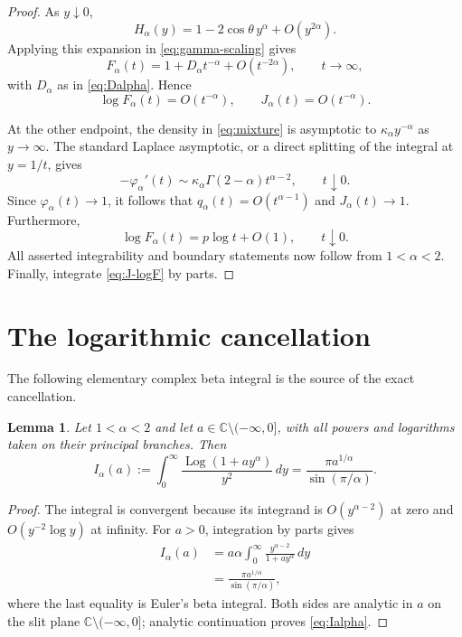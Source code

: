 \documentclass[11pt]{article}
\newtheorem{lemma}[theorem]{Lemma}
\theoremstyle{remark}
\newcommand{\Log}{\operatorname{Log}}
\begin{document}
\begin{proof}
As $y\downarrow0$,
\[
 H_\alpha(y)
 =1-2\cos\theta\,y^\alpha+O(y^{2\alpha}).
\]
Applying this expansion in \eqref{eq:gamma-scaling} gives
\[
 F_\alpha(t)
 =1+D_\alpha t^{-\alpha}+O(t^{-2\alpha}),
 \qquad t\to\infty,
\]
with $D_\alpha$ as in \eqref{eq:Dalpha}.  Hence
\[
 \log F_\alpha(t)=O(t^{-\alpha}),
 \qquad
 J_\alpha(t)=O(t^{-\alpha}).
\]

At the other endpoint, the density in \eqref{eq:mixture} is
asymptotic to $\kappa_\alpha y^{-\alpha}$ as $y\to\infty$.
The standard Laplace asymptotic, or a direct splitting of the
integral at $y=1/t$, gives
\[
 -\varphi_\alpha'(t)
 \sim\kappa_\alpha\Gamma(2-\alpha)t^{\alpha-2},
 \qquad t\downarrow0.
\]
Since $\varphi_\alpha(t)\to1$, it follows that
$q_\alpha(t)=O(t^{\alpha-1})$ and $J_\alpha(t)\to1$.
Furthermore,
\[
 \log F_\alpha(t)=p\log t+O(1),
 \qquad t\downarrow0.
\]
All asserted integrability and boundary statements now follow from
$1<\alpha<2$.  Finally, integrate
\eqref{eq:J-logF} by parts.
\end{proof}

\section{The logarithmic cancellation}

The following elementary complex beta integral is the source of the
exact cancellation.

\begin{lemma}\label{lem:complex-beta}
Let $1<\alpha<2$ and let $a\in\mathbb{C}\setminus(-\infty,0]$,
with all powers and logarithms taken on their principal branches.
Then
\begin{equation}\label{eq:Ialpha}
 I_\alpha(a)
 :=\int_0^\infty
   \frac{\Log(1+a y^\alpha)}{y^2}\,dy
 =\frac{\pi a^{1/\alpha}}{\sin(\pi/\alpha)}.
\end{equation}
\end{lemma}

\begin{proof}
The integral is convergent because its integrand is
$O(y^{\alpha-2})$ at zero and $O(y^{-2}\log y)$ at infinity.
For $a>0$, integration by parts gives
\begin{align*}
 I_\alpha(a)
 &=a\alpha\int_0^\infty
   \frac{y^{\alpha-2}}{1+a y^\alpha}\,dy \\
 &=\frac{\pi a^{1/\alpha}}{\sin(\pi/\alpha)},
\end{align*}
where the last equality is Euler's beta integral.  Both sides are
analytic in $a$ on the slit plane
$\mathbb{C}\setminus(-\infty,0]$; analytic continuation proves
\eqref{eq:Ialpha}.
\end{proof}
\end{document}
